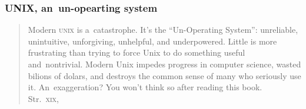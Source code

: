 \documentclass[10pt,t]{beamer}
\begin{document}
\begin{frame}
  \frametitle{UNIX, an~un-opearting system}


  \begin{quote}

    Modern \textsc{unix} is a~catastrophe. It's the ``Un-Operating System'':
    unreliable, unintuitive, unforgiving, unhelpful, and underpowered.
    Little is more frustrating than trying to force Unix to do something
    useful and~nontrivial. Modern Unix impedes progress in computer
    science, wasted bilions of dolars, and destroys the common sense of
    many who seriously use it. An~exaggeration? You won't think so after
    reading this book. \\
    Str.~\textsc{xix},
    \parencite{Garfinkel-Weise-Strassmann-The-UNIX-HATERS-Handbook-Pub-1994}

  \end{quote}

\end{frame}
\end{document}
